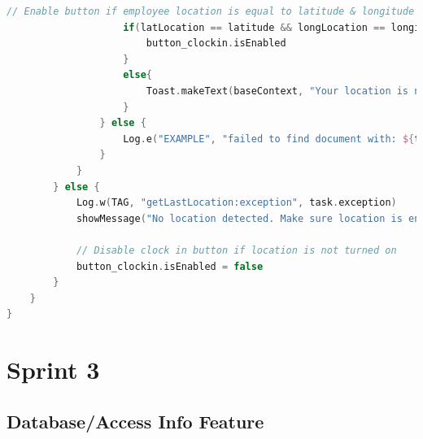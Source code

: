 \begin{lstlisting}[caption={Location code}, label={lst:example1}, language=Kotlin]
                    // Enable button if employee location is equal to latitude & longitude in document
                    if(latLocation == latitude && longLocation == longitude){
                        button_clockin.isEnabled
                    }
                    else{
                        Toast.makeText(baseContext, "Your location is not in the workplace, please close app and try again", Toast.LENGTH_LONG).show()
                    }
                } else {
                    Log.e("EXAMPLE", "failed to find document with: ${task.error}")
                }
            }
        } else {
            Log.w(TAG, "getLastLocation:exception", task.exception)
            showMessage("No location detected. Make sure location is enabled on the device.")

            // Disable clock in button if location is not turned on
            button_clockin.isEnabled = false
        }
    }
}
\end{lstlisting}

\section{Sprint 3}
\subsection{Database/Access Info Feature}
